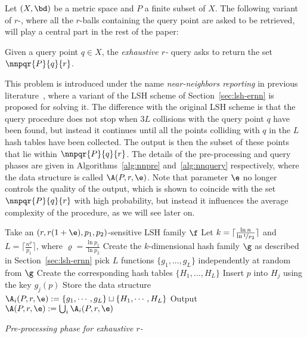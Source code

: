 Let $(X,\bd)$ be a metric space and $P$ a finite subset of $X$. The
following variant of $r$-\pleb, where all the $r$-balls containing the
query point are asked to be retrieved, will play a central part in the
rest of the paper:
\begin{problem} \label{problem:allnnexact}
  Given a query point $q\in X$, the {\em exhaustive $r$-\pleb} query
  asks to return the set $\nnpqr{P}{q}{r}$.
\end{problem}
This problem is introduced under the name {\em near-neighbors
  reporting} in previous literature~\cite[Chapter~1]{SDI05}, where a
variant of the LSH scheme of Section~\ref{sec:lsh-ernn} is proposed
for solving it. The difference with the original LSH scheme is that
the query procedure does not stop when $3L$ collisions with the query
point $q$ have been found, but instead it continues until all the
points colliding with $q$ in the $L$ hash tables have been
collected. The output is then the subset of these points that lie
within $\nnpqr{P}{q}{r}$. The details of the pre-processing and query
phases are given in Algorithms~\ref{alg:nnpre} and~\ref{alg:nnquery}
respectively, where the data structure is called $\A(P,r,\e)$. Note
that parameter $\e$ no longer controls the quality of the output,
which is shown to coincide with the set $\nnpqr{P}{q}{r}$ with high
probability, but instead it influences the average complexity of the
procedure, as we will see later on.


\begin{algorithm}[!htb]
\LinesNumbered


  \BlankLine

  Take an $(r, r(1+\e), p_1, p_2)$-sensitive LSH family $\f$\; 
  Let $k=\lceil\frac{\ln n}{\ln\nicefrac{1}{p_2}}\rceil$ and $L=\lceil \frac{n^\varrho}{p_1}\rceil$, where $\varrho=\frac{\ln p_1}{\ln p_2}$\;
  Create the $k$-dimensional hash family $\g$ as described in Section~\ref{sec:lsh-ernn}\;
   {  
    pick $L$ functions $\{g_1,\ldots,g_{L}\}$ independently at random from $\g$\;
    Create the corresponding hash tables $\{H_1,\ldots,H_{L}\}$\;
     {
       {
        Insert $p$ into $H_j$ using the key $g_j(p)$\;
      }
    }
    Store the data structure $\A_i(P, r, \e):=\{g_1, \cdots, g_{L}\}\sqcup \{H_1, \cdots, H_{L}\}$\;
  }
  Output $\A(P, r, \e) := \bigcup_i \A_i(P, r, \e)$\;


  \caption{\em Pre-processing phase for exhaustive $r$-\pleb}
  \label{alg:nnpre}
\end{algorithm}

